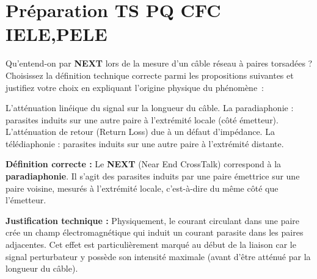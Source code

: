 \documentclass[a4paper,12pt,answers,addpoints]{exam}
\begin{document}
	\unframedsolutions
	\pointsinmargin
	\bracketedpoints
	
\section*{Préparation TS PQ CFC IELE,PELE}
\begin{questions}
\question[3] Qu'entend-on par \textbf{NEXT} lors de la mesure d'un câble réseau à paires torsadées ? Choisissez la définition technique correcte parmi les propositions suivantes et justifiez votre choix en expliquant l'origine physique du phénomène~:
 \begin{checkboxes}
	\choice L'atténuation linéique du signal sur la longueur du câble.
	\CorrectChoice La paradiaphonie : parasites induits sur une autre paire à l'extrémité locale (côté émetteur).
	\choice L'atténuation de retour (Return Loss) due à un défaut d'impédance.
	\choice La télédiaphonie : parasites induits sur une autre paire à l'extrémité distante.
\end{checkboxes}

\begin{solution}

\textbf{Définition correcte :}
Le \textbf{NEXT} (Near End CrossTalk) correspond à la \textbf{paradiaphonie}. Il s'agit des parasites induits par une paire émettrice sur une paire voisine, mesurés à l'extrémité locale, c'est-à-dire du même côté que l'émetteur.

\textbf{Justification technique :}
Physiquement, le courant circulant dans une paire crée un champ électromagnétique qui induit un courant parasite dans les paires adjacentes. Cet effet est particulièrement marqué au début de la liaison car le signal perturbateur y possède son intensité maximale (avant d'être atténué par la longueur du câble). 




\end{solution}
\end{questions}
\end{document}

